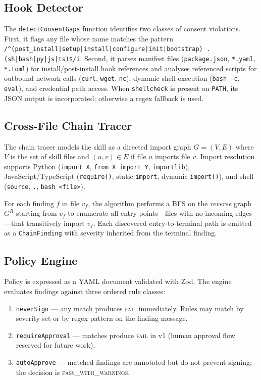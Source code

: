 \documentclass[11pt,twocolumn]{article}
\begin{document}
\subsection{Hook Detector}

The \texttt{detectConsentGaps} function identifies two classes of consent
violations. First, it flags any file whose name matches the pattern
\texttt{/\^{}(post\_install|setup|install|configure|init|bootstrap)\linebreak
.(sh|bash|py|js|ts)\$/i}. Second, it parses manifest files
(\texttt{package.json}, \texttt{*.yaml}, \texttt{*.toml}) for
install/post-install hook references and analyses referenced scripts for
outbound network calls (\texttt{curl}, \texttt{wget}, \texttt{nc}),
dynamic shell execution (\texttt{bash -c}, \texttt{eval}), and credential
path access. When \texttt{shellcheck} is present on \texttt{PATH}, its
JSON output is incorporated; otherwise a regex fallback is used.

\subsection{Cross-File Chain Tracer}

The chain tracer models the skill as a directed import graph
$G = (V, E)$ where $V$ is the set of skill files and
$(u, v) \in E$ if file $u$ imports file $v$. Import resolution supports
Python (\texttt{import X}, \texttt{from X import Y}, \texttt{importlib}),
JavaScript/TypeScript (\texttt{require()}, static \texttt{import},
dynamic \texttt{import()}), and shell (\texttt{source}, \texttt{.},
\texttt{bash <file>}).

For each finding $f$ in file $v_f$, the algorithm performs a BFS on the
\emph{reverse} graph $G^R$ starting from $v_f$ to enumerate all entry
points---files with no incoming edges---that transitively import $v_f$.
Each discovered entry-to-terminal path is emitted as a
\texttt{ChainFinding} with severity inherited from the terminal finding.

\subsection{Policy Engine}

Policy is expressed as a YAML document validated with Zod. The engine
evaluates findings against three ordered rule classes:

\begin{enumerate}[leftmargin=*,topsep=2pt,itemsep=1pt]
  \item \texttt{neverSign} --- any match produces \textsc{fail} immediately.
  Rules may match by severity set or by regex pattern on the finding message.
  \item \texttt{requireApproval} --- matches produce \textsc{fail} in v1
  (human approval flow reserved for future work).
  \item \texttt{autoApprove} --- matched findings are annotated but do not
  prevent signing; the decision is \textsc{pass\_with\_warnings}.
\end{enumerate}
\end{document}
